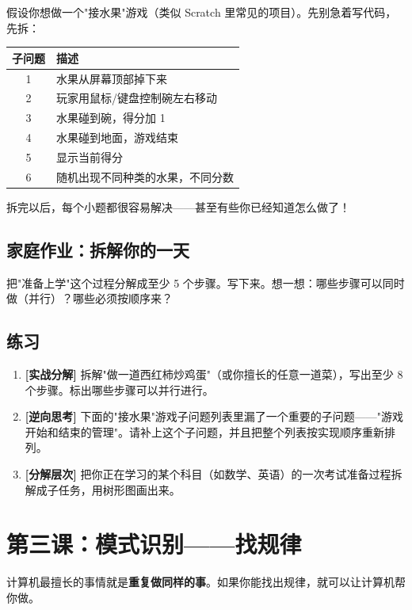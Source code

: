 \documentclass[a4paper,12pt]{ctexart}
\begin{document}
假设你想做一个"接水果"游戏（类似 Scratch 里常见的项目）。先别急着写代码，先拆：

\begin{center}
\begin{tabular}{|c|l|}
\hline
\textbf{子问题} & \textbf{描述} \\ \hline
1 & 水果从屏幕顶部掉下来 \\ \hline
2 & 玩家用鼠标/键盘控制碗左右移动 \\ \hline
3 & 水果碰到碗，得分加 1 \\ \hline
4 & 水果碰到地面，游戏结束 \\ \hline
5 & 显示当前得分 \\ \hline
6 & 随机出现不同种类的水果，不同分数 \\ \hline
\end{tabular}
\end{center}

拆完以后，每个小题都很容易解决——甚至有些你已经知道怎么做了！

\subsection*{家庭作业：拆解你的一天}

把"准备上学"这个过程分解成至少 5 个步骤。写下来。想一想：哪些步骤可以同时做（并行）？哪些必须按顺序来？

\subsection*{练习}

\begin{enumerate}
  \item \textbf{[实战分解]} 拆解"做一道西红柿炒鸡蛋"（或你擅长的任意一道菜），写出至少 8 个步骤。标出哪些步骤可以并行进行。
  \item \textbf{[逆向思考]} 下面的"接水果"游戏子问题列表里漏了一个重要的子问题——"游戏开始和结束的管理"。请补上这个子问题，并且把整个列表按实现顺序重新排列。
  \item \textbf{[分解层次]} 把你正在学习的某个科目（如数学、英语）的一次考试准备过程拆解成子任务，用树形图画出来。
\end{enumerate}

\section*{第三课：模式识别——找规律}

计算机最擅长的事情就是\textbf{重复做同样的事}。如果你能找出规律，就可以让计算机帮你做。
\end{document}

